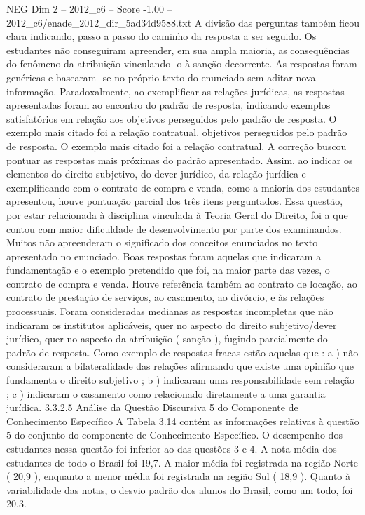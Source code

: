\begin{textsample}{NEG Dim 2 – 2012\_c6 – Score -1.00 – 2012\_c6/enade\_2012\_dir\_5ad34d9588.txt}
A divisão das perguntas também ficou clara indicando, passo a passo do caminho da resposta a ser seguido.
Os estudantes não conseguiram apreender, em sua ampla maioria, as consequências do fenômeno da atribuição vinculando -o à sanção decorrente.
As respostas foram genéricas e basearam -se no próprio texto do enunciado sem aditar nova informação.
Paradoxalmente, ao exemplificar as relações jurídicas, as respostas apresentadas foram ao encontro do padrão de resposta, indicando exemplos satisfatórios em relação aos objetivos perseguidos pelo padrão de resposta.
O exemplo mais citado foi a relação contratual. objetivos perseguidos pelo padrão de resposta.
O exemplo mais citado foi a relação contratual.
A correção buscou pontuar as respostas mais próximas do padrão apresentado.
Assim, ao indicar os elementos do direito subjetivo, do dever jurídico, da relação jurídica e exemplificando com o contrato de compra e venda, como a maioria dos estudantes apresentou, houve pontuação parcial dos três itens perguntados.
Essa questão, por estar relacionada à disciplina vinculada à Teoria Geral do Direito, foi a que contou com maior dificuldade de desenvolvimento por parte dos examinandos.
Muitos não apreenderam o significado dos conceitos enunciados no texto apresentado no enunciado.
Boas respostas foram aquelas que indicaram a fundamentação e o exemplo pretendido que foi, na maior parte das vezes, o contrato de compra e venda.
Houve referência também ao contrato de locação, ao contrato de prestação de serviços, ao casamento, ao divórcio, e às relações processuais.
Foram consideradas medianas as respostas incompletas que não indicaram os institutos aplicáveis, quer no aspecto do direito subjetivo/dever jurídico, quer no aspecto da atribuição ( sanção ), fugindo parcialmente do padrão de resposta.
Como exemplo de respostas fracas estão aquelas que : a ) não consideraram a bilateralidade das relações afirmando que existe uma opinião que fundamenta o direito subjetivo ; b ) indicaram uma responsabilidade sem relação ; c ) indicaram o casamento como relacionado diretamente a uma garantia jurídica. 3.3.2.5 Análise da Questão Discursiva 5 do Componente de Conhecimento Específico A Tabela 3.14 contém as informações relativas à questão 5 do conjunto do componente de Conhecimento Específico.
O desempenho dos estudantes nessa questão foi inferior ao das questões 3 e 4.
A nota média dos estudantes de todo o Brasil foi 19,7.
A maior média foi registrada na região Norte ( 20,9 ), enquanto a menor média foi registrada na região Sul ( 18,9 ).
Quanto à variabilidade das notas, o desvio padrão dos alunos do Brasil, como um todo, foi 20,3.

\end{textsample}
